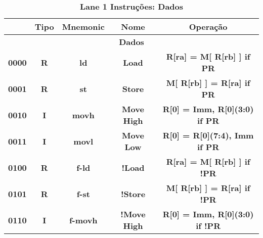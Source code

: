 \documentclass{article}
\begin{document}
    \begin{table}[H]
      \centering
      \captionsetup{labelformat=empty, skip=0pt}
      \caption{\textbf{Lane 1 Instruções: Dados}}
      \begin{tabular}{|c|*{4}{c|}}
        \hline
        \rowcolor{gray!50}
        \multicolumn{1}{|c|}{\textbf{Opcode}} & \multicolumn{1}{|c|}{\textbf{Tipo}} & \multicolumn{1}{|c|}{\textbf{Mnemonic}} & \multicolumn{1}{|c|}{\textbf{Nome}}        & \multicolumn{1}{|c|}{\textbf{Operação}}                      \\ \hline
        \multicolumn{5}{|c|}{\textbf{Dados}} \\ \hline 
        \multicolumn{1}{|c|}{\textbf{0000}}   & \multicolumn{1}{c|}{\textbf{R}}     & \multicolumn{1}{c|}{\textbf{ld}}        & \multicolumn{1}{c|}{\textbf{Load}}         & \multicolumn{1}{c|}{\textbf{R[ra] = M[ R[rb] ] if PR}}       \\ \hline
        \multicolumn{1}{|c|}{\textbf{0001}}   & \multicolumn{1}{c|}{\textbf{R}}     & \multicolumn{1}{c|}{\textbf{st}}        & \multicolumn{1}{c|}{\textbf{Store}}        & \multicolumn{1}{c|}{\textbf{M[ R[rb] ] = R[ra] if PR}}       \\ \hline
        \multicolumn{1}{|c|}{\textbf{0010}}   & \multicolumn{1}{c|}{\textbf{I}}     & \multicolumn{1}{c|}{\textbf{movh}}      & \multicolumn{1}{c|}{\textbf{Move High}}    & \multicolumn{1}{c|}{\textbf{R[0] = {Imm, R[0](3:0)} if PR}}  \\ \hline
        \multicolumn{1}{|c|}{\textbf{0011}}   & \multicolumn{1}{c|}{\textbf{I}}     & \multicolumn{1}{c|}{\textbf{movl}}      & \multicolumn{1}{c|}{\textbf{Move Low}}     & \multicolumn{1}{c|}{\textbf{R[0] = {R[0](7:4), Imm} if PR}}  \\ \hline
        \multicolumn{1}{|c|}{\textbf{0100}}   & \multicolumn{1}{c|}{\textbf{R}}     & \multicolumn{1}{c|}{\textbf{f-ld}}      & \multicolumn{1}{c|}{\textbf{!Load}}        & \multicolumn{1}{c|}{\textbf{R[ra] = M[ R[rb] ] if !PR}}      \\ \hline
        \multicolumn{1}{|c|}{\textbf{0101}}   & \multicolumn{1}{c|}{\textbf{R}}     & \multicolumn{1}{c|}{\textbf{f-st}}      & \multicolumn{1}{c|}{\textbf{!Store}}       & \multicolumn{1}{c|}{\textbf{M[ R[rb] ] = R[ra] if !PR}}      \\ \hline
        \multicolumn{1}{|c|}{\textbf{0110}}   & \multicolumn{1}{c|}{\textbf{I}}     & \multicolumn{1}{c|}{\textbf{f-movh}}    & \multicolumn{1}{c|}{\textbf{!Move High}}   & \multicolumn{1}{c|}{\textbf{R[0] = {Imm, R[0](3:0)} if !PR}} \\ \hline

\end{tabular}
\end{table}
\end{document}
